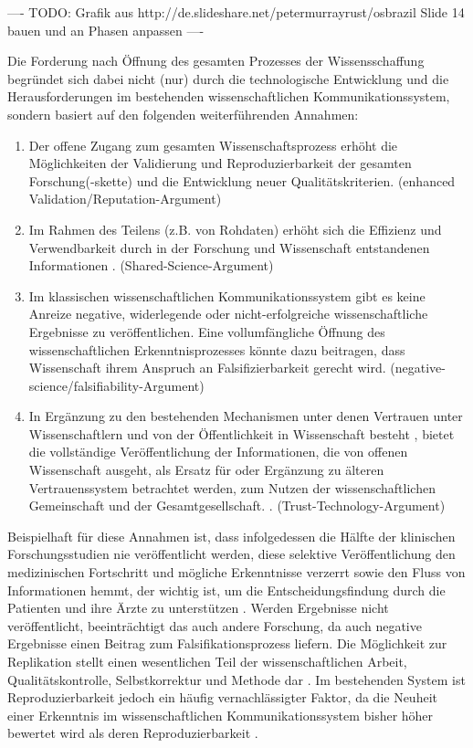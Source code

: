 ---- TODO: Grafik aus http://de.slideshare.net/petermurrayrust/osbrazil Slide 14 bauen und an Phasen anpassen ----

Die Forderung nach Öffnung des gesamten Prozesses der Wissensschaffung begründet sich dabei nicht (nur) durch die technologische Entwicklung und die Herausforderungen im bestehenden wissenschaftlichen Kommunikationssystem, sondern basiert auf den folgenden weiterführenden Annahmen:
\begin{enumerate}
\item Der offene Zugang zum gesamten Wissenschaftsprozess erhöht die Möglichkeiten der Validierung und Reproduzierbarkeit der gesamten Forschung(-skette) \cite{Nosek_2015} \cite{Aleksic_2014} \cite{Krumholz_2014} \cite{hey_2015_open} und die Entwicklung neuer Qualitätskriterien. (enhanced Validation/Reputation-Argument)
\item Im Rahmen des Teilens (z.B. von Rohdaten) erhöht sich die Effizienz und Verwendbarkeit durch in der Forschung und Wissenschaft entstandenen Informationen \cite{Fecher_2015}. (Shared-Science-Argument)
\item Im klassischen wissenschaftlichen Kommunikationssystem gibt es keine Anreize negative, widerlegende oder nicht-erfolgreiche wissenschaftliche Ergebnisse zu veröffentlichen. Eine vollumfängliche Öffnung des wissenschaftlichen Erkenntnisprozesses könnte dazu beitragen, dass Wissenschaft ihrem Anspruch an Falsifizierbarkeit gerecht wird. (negative-science/falsifiability-Argument)
\item In Ergänzung zu den bestehenden Mechanismen unter denen Vertrauen unter Wissenschaftlern und von der Öffentlichkeit in Wissenschaft besteht \cite{weingart_2005_wissenschaft}, bietet die vollständige Veröffentlichung der Informationen, die von offenen Wissenschaft ausgeht, als Ersatz für oder Ergänzung zu älteren Vertrauenssystem betrachtet werden, zum Nutzen der wissenschaftlichen Gemeinschaft und der Gesamtgesellschaft. \cite{grand_2012_open}. (Trust-Technology-Argument)
\end{enumerate}

Beispielhaft für diese Annahmen ist, dass infolgedessen die Hälfte der klinischen Forschungsstudien nie veröffentlicht werden, diese selektive Veröffentlichung den medizinischen Fortschritt und mögliche Erkenntnisse verzerrt sowie den Fluss von Informationen hemmt, der wichtig ist, um die Entscheidungsfindung durch die Patienten und ihre Ärzte zu unterstützen \cite{Ross_2013}. Werden Ergebnisse nicht veröffentlicht, beeinträchtigt das auch andere Forschung, da auch negative Ergebnisse einen Beitrag zum Falsifikationsprozess liefern. Die Möglichkeit zur Replikation stellt einen wesentlichen Teil der wissenschaftlichen Arbeit, Qualitätskontrolle, Selbstkorrektur und Methode dar \cite{Nosek_2015}. Im bestehenden System ist Reproduzierbarkeit jedoch ein häufig vernachlässigter Faktor, da die Neuheit einer Erkenntnis im wissenschaftlichen Kommunikationssystem bisher höher bewertet wird als deren Reproduzierbarkeit \cite{Nosek_2015}.

